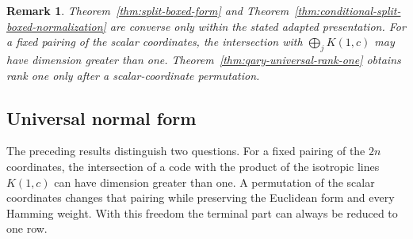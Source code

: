 \documentclass[12pt]{article}
\newtheorem{remark}[theorem]{Remark}
\begin{document}
\begin{remark}
\rm
Theorem~\ref{thm:split-boxed-form} and
Theorem~\ref{thm:conditional-split-boxed-normalization} are converse only
within the stated adapted presentation.  For a fixed pairing of the scalar
coordinates, the intersection with \(\bigoplus_jK(1,c)\) may have dimension
greater than one.  Theorem~\ref{thm:qary-universal-rank-one} obtains rank one
only after a scalar-coordinate permutation.
\end{remark}

\subsection{Universal normal form}\label{sec:universal-normal-form}

The preceding results distinguish two questions.  For a fixed pairing of
the \(2n\) coordinates, the intersection of a code with the product of the
isotropic lines \(K(1,c)\) can have dimension greater than one.  A
permutation of the scalar coordinates changes that pairing while preserving
the Euclidean form and every Hamming weight.  With this freedom the terminal
part can always be reduced to one row.
\end{document}
